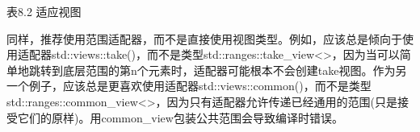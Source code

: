 \begin{center}
表8.2 适应视图
\end{center}

同样，推荐使用范围适配器，而不是直接使用视图类型。例如，应该总是倾向于使用适配器std::views::take()，而不是类型std::ranges::take\_view<>，因为当可以简单地跳转到底层范围的第n个元素时，适配器可能根本不会创建take视图。作为另一个例子，应该总是更喜欢使用适配器std::views::common()，而不是类型std::ranges::common\_view<>，因为只有适配器允许传递已经通用的范围(只是接受它们的原样)。用common\_view包装公共范围会导致编译时错误。




